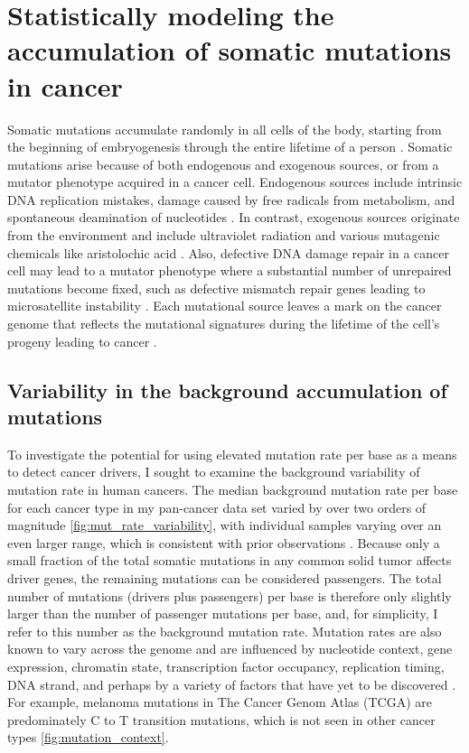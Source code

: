 
\chapter{Statistically modeling the accumulation of somatic mutations in cancer}
\label{chap:ch2}

Somatic mutations accumulate randomly in all cells of the body, starting from the beginning of embryogenesis through the entire lifetime of a person \cite{RN63}. Somatic mutations arise because of both endogenous and exogenous sources, or from a mutator phenotype acquired in a cancer cell. Endogenous sources include intrinsic DNA replication mistakes, damage caused by free radicals from metabolism, and spontaneous deamination of nucleotides \cite{RN64}. In contrast, exogenous sources originate from the environment and include ultraviolet radiation \cite{RN64} and various mutagenic chemicals like aristolochic acid \cite{RN65}.  Also, defective DNA damage repair in a cancer cell may lead to a mutator phenotype where a substantial number of unrepaired mutations become fixed, such as defective mismatch repair genes leading to microsatellite instability \cite{RN68}. Each mutational source leaves a mark on the cancer genome that reflects the mutational signatures during the lifetime of the cell's progeny leading to cancer \cite{RN64}.

\section{Variability in the background accumulation of mutations}

To investigate the potential for using elevated mutation rate per base as a means to detect cancer drivers, I sought to examine the background variability of mutation rate in human cancers. The median background mutation rate per base for each cancer type in my pan-cancer data set \cite{RN70} varied by over two orders of magnitude \ref{fig:mut_rate_variability}, with individual samples varying over an even larger range, which is consistent with prior observations \cite{RN13, RN51}. Because only a small fraction of the total somatic mutations in any common solid tumor affects driver genes, the remaining mutations can be considered passengers. The total number of mutations (drivers plus passengers) per base is therefore only slightly larger than the number of passenger mutations per base, and, for simplicity, I refer to this number as the background mutation rate. Mutation rates are also known to vary across the genome \cite{RN13} and are influenced by nucleotide context, gene expression, chromatin state, transcription factor occupancy, replication timing, DNA strand, and perhaps by a variety of factors that have yet to be discovered \cite{RN72, RN73, RN51, RN74}. For example, melanoma mutations in The Cancer Genom Atlas (TCGA) are predominately C to T transition mutations, which is not seen in other cancer types \ref{fig:mutation_context}.


